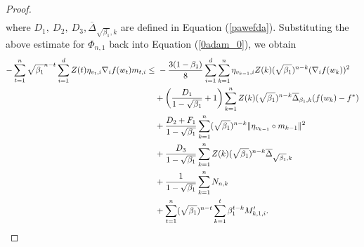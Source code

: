 \documentclass{article} %
\begin{document}
\begin{proof}
\begin{align*}
\end{align*}
where $D_1,\ D_2,\ D_3, \overline{\Delta}_{\sqrt{\beta_{1}},k}$ are defined in Equation (\ref{pawefda}). Substituting the above estimate for \(\Phi_{n,1}\) back into Equation (\ref{0adam_0}), we obtain
\begin{align*}
-\sum_{t=1}^{n}\sqrt{\beta_{1}}^{n-t}\sum_{i=1}^{d}Z(t)\eta_{v_{t},i}\nabla_{i}f(w_{t})m_{t,i}\le &\ -\frac{3(1-\beta_{1})}{8}\sum_{i=1}^{d}\sum_{k=1}^{n}\eta_{v_{k-1},i}Z(k)(\sqrt{\beta_{1}})^{n-k}(\nabla_{i}f(w_{k}))^{2}\notag\\&+\left(\frac{D_{1}}{1-\sqrt{\beta_{1}}}+1\right)\sum_{k=1}^{n}Z(k)(\sqrt{\beta_{1}})^{n-k}\overline{\Delta}_{\beta_{1},k}(f(w_{k})-f^*)\notag\\&+\frac{D_{2}+F_1}{1-\sqrt{\beta_{1}}}\sum_{k=1}^{n}(\sqrt{\beta_{1}})^{n-k}\|\eta_{v_{k-1}}\circ m_{k-1}\|^{2}\notag\\&+\frac{D_{3}}{1-\sqrt{\beta_{1}}}\sum_{k=1}^{n}Z(k)(\sqrt{\beta_{1}})^{n-k}\overline{\Delta}_{\sqrt{\beta_{1}},k}\notag\\&+\frac{{1}}{1-\sqrt{\beta_{1}}}\sum_{k=1}^{n}N_{n,k}\notag\\&+\sum_{t=1}^{n}(\sqrt{\beta_{1}})^{n-t}\sum_{k=1}^{t}\beta_{1}^{t-k}M_{k,1,i}'. \tag*{\qedhere}
\end{align*}
\end{proof}
\end{document}
